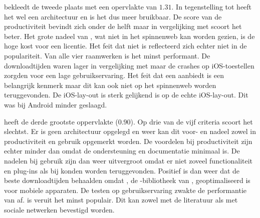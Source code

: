 
\kendo{} bekleedt de tweede plaats met een opervlakte van $1.31$.
In tegenstelling tot \jqm{} heeft het wel een architectuur en is het dus meer bruikbaar.
De score van de productiviteit bevindt zich onder de helft maar in vergelijking met \st{} scoort het beter.
Het grote nadeel van \kendo{},  wat niet in het spinnenweb kan worden gezien,  is de hoge kost voor een licentie.
Het feit dat \kendo{} niet  is reflecteerd zich echter niet in de populariteit.
Van alle vier raamwerken is \kendo{} het minst performant.
De downloadtijden waren lager in vergelijking met \st{} maar de crashes op iOS-toestellen zorgden voor een lage gebruikservaring.
Het feit dat \kendo{} een  aanbiedt is een belangrijk kenmerk maar dit kan ook niet op het spinnenweb worden teruggevonden.
De iOS-lay-out is sterk gelijkend is op de echte iOS-lay-out.
Dit was bij Android minder geslaagd.


\lungo{} heeft de derde grootste oppervlakte ($0.90$).
Op drie van de vijf criteria scoort \lungo{} het slechtst.
Er is geen architectuur opgelegd en weer kan dit voor- en nadeel zowel in productiviteit en gebruik opgemerkt worden.
De voordelen bij productiviteit zijn echter minder dan \jqm{} omdat de ondersteuning en documentatie minimaal is.
De nadelen bij gebruik zijn dan weer uitvergroot omdat er niet zoveel functionaliteit en plug-ins als bij \jqm{} konden worden teruggevonden.
Positief is dan weer dat \lungo{} de beste downloadtijden behaalden omdat \quo{}, de \js{}-bibliotheek van \lungo{},  geoptimaliseerd is voor mobiele apparaten.
De testen op gebruikservaring zwakte de performantie van \lungo{} af.
\lungo{} is veruit het minst populair.
Dit kan zowel met de literatuur als met sociale netwerken bevestigd worden.

